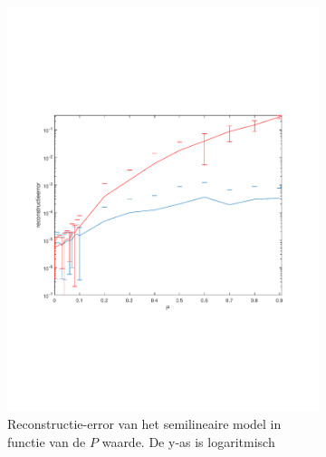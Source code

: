 \documentclass[12pt]{report}
\begin{document}
\begin{figure}
\begin{subfigure}[b]{0.5\textwidth}
\includegraphics[width=\textwidth,trim=0 200 0 175 cm]{PMC_AAM_10_100_Elog.pdf}
\caption{Reconstructie-error van het semilineaire model in functie van de $P$ waarde. De y-as is logaritmisch \label{fig:AElog} }
\end{subfigure}
\begin{subfigure}[b]{0.5\textwidth}

\end{subfigure}
\end{figure}
\end{document}
